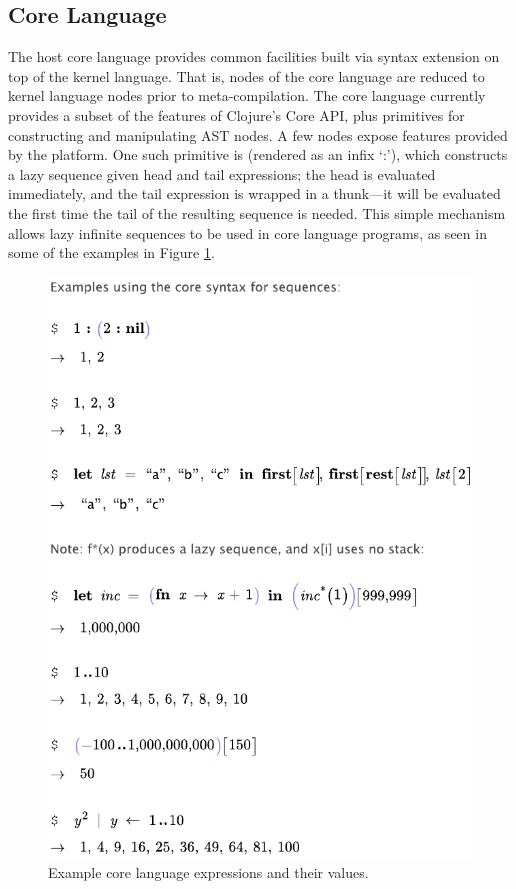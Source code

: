 \subsection{Core Language}
The host core language provides common facilities built via syntax extension on top of the kernel language. That is, nodes of the core language are reduced to kernel language nodes prior to meta-compilation. The core language currently provides a subset of the features of Clojure's Core API\cite{clojure-and}, plus primitives for constructing and manipulating AST nodes. A few nodes expose features provided by the platform. One such primitive is  (rendered as an infix `:'), which constructs a lazy sequence given head and tail expressions; the head is evaluated immediately, and the tail expression is wrapped in a thunk---it will be evaluated the first time the tail of the resulting sequence is needed. This simple mechanism allows lazy infinite sequences to be used in core language programs, as seen in some of the examples in Figure \ref{fig-core}.

\begin{figure}
	
	\begin{center}
	\includegraphics[scale=0.8]{src/image/core3.pdf}
	\end{center}
	
	
	\caption{Example core language expressions and their values.}
	\label{fig-core}
\end{figure}



